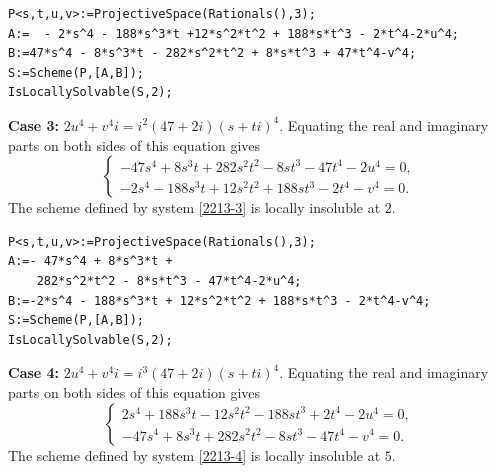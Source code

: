 \documentclass[a4paper,12pt,english,reqno]{amsart}
\begin{document}

\begin{lstlisting}
P<s,t,u,v>:=ProjectiveSpace(Rationals(),3);
A:=  - 2*s^4 - 188*s^3*t +12*s^2*t^2 + 188*s*t^3 - 2*t^4-2*u^4;
B:=47*s^4 - 8*s^3*t - 282*s^2*t^2 + 8*s*t^3 + 47*t^4-v^4;
S:=Scheme(P,[A,B]);
IsLocallySolvable(S,2);
\end{lstlisting}

{\bf Case 3:} $2u^4+v^4i=i^2(47+2i)(s+ti)^4$. Equating the real and imaginary parts on both sides of this equation gives
\begin{equation}\label{2213-3}
\begin{cases}
-47s^4 + 8s^3t + 282s^2t^2 - 8st^3 - 47t^4 - 2u^4=0,\\
-2s^4 - 188s^3t + 12s^2t^2 + 188st^3 - 2t^4 - v^4=0.
\end{cases}
\end{equation}
The scheme defined by system \eqref{2213-3} is locally insoluble at $2$.

\begin{lstlisting}
P<s,t,u,v>:=ProjectiveSpace(Rationals(),3);
A:=- 47*s^4 + 8*s^3*t +
    282*s^2*t^2 - 8*s*t^3 - 47*t^4-2*u^4;
B:=-2*s^4 - 188*s^3*t + 12*s^2*t^2 + 188*s*t^3 - 2*t^4-v^4;
S:=Scheme(P,[A,B]);
IsLocallySolvable(S,2);
\end{lstlisting}

{\bf Case 4:} $2u^4+v^4i=i^3(47+2i)(s+ti)^4$. Equating the real and imaginary parts on both sides of this equation gives
\begin{equation}\label{2213-4}
\begin{cases}
2s^4 + 188s^3t - 12s^2t^2 - 188st^3 + 2t^4-2u^4=0,\\
-47s^4 + 8s^3t + 282s^2t^2 - 8st^3 - 47t^4-v^4=0.
\end{cases}
\end{equation}
The scheme defined by system \eqref{2213-4} is locally insoluble at $5$.
\end{document}
